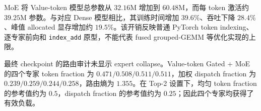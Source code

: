 \documentclass[letterpaper]{article}
\begin{document}
\begin{table}[t]
\centering
\caption{架构扩展的资源开销。Active/token 是每个 token 参与计算的参数量；当前状态张量按最大槽位预分配，逻辑活跃字节不等于物理显存节省。}
\label{tab:efficiency}
%
\end{table}

MoE 将 Value-token 模型总参数从 $32.16$M 增加到 $60.48$M，而每 token 激活约 $39.25$M 参数。与对应 Dense 模型相比，其训练时间增加 $39.6\%$、吞吐下降 $28.4\%$、峰值 allocated 显存增加约 $19.5\%$。该开销反映普通 PyTorch token indexing、逐专家前向和 \texttt{index\_add} 原型，不能代表 fused grouped-GEMM 等优化实现的上限。

最终 checkpoint 的路由审计未显示 expert collapse。Value-token Gated + MoE 的四个专家 token fraction 为 $0.471/0.508/0.511/0.511$，加权 dispatch fraction 为 $0.239/0.259/0.244/0.258$，路由熵为 $1.355$。在 Top-2 设置下，均匀 token fraction 的参考值约为 $0.5$，dispatch fraction 的参考值约为 $0.25$；因此四个专家均获得了有效负载。

\begin{table}[t]
\centering
\caption{MoE 路由与负载均衡审计。Token fraction 的四项之和约为 2，dispatch fraction 的四项之和约为 1。}
\label{tab:moe-routing}
%
\end{table}
\end{document}
